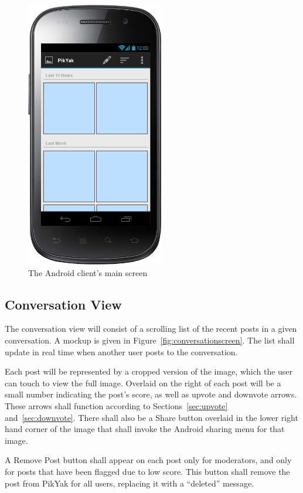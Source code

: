 \documentclass[11pt]{scrartcl}
\begin{document}
        \begin{figure}[h]
            \centering \includegraphics[width=6cm,keepaspectratio]{mockups/main}
            \caption{The Android client's main screen}
            \label{fig:mainscreen}
        \end{figure}

    \subsection{Conversation View}
    \label{sec:conversation}
        The conversation view will consist of a scrolling list of the recent posts in a given conversation.
        A mockup is given in Figure~\ref{fig:conversationscreen}.
        The list shall update in real time when another user posts to the conversation.

        Each post will be represented by a cropped version of the image, which the user can touch to view the full image.
        Overlaid on the right of each post will be a small number indicating the post's score, as well as upvote and downvote arrows.
        These arrows shall function according to Sections~\ref{sec:upvote} and~\ref{sec:downvote}.
        There shall also be a Share button overlaid in the lower right hand corner of the image that shall invoke the Android sharing menu for that image.

        A Remove Post button shall appear on each post only for moderators, and only for posts that have been flagged due to low score.  This button shall remove the post from PikYak for all users, replacing it with a ``deleted'' message.
\end{document}
